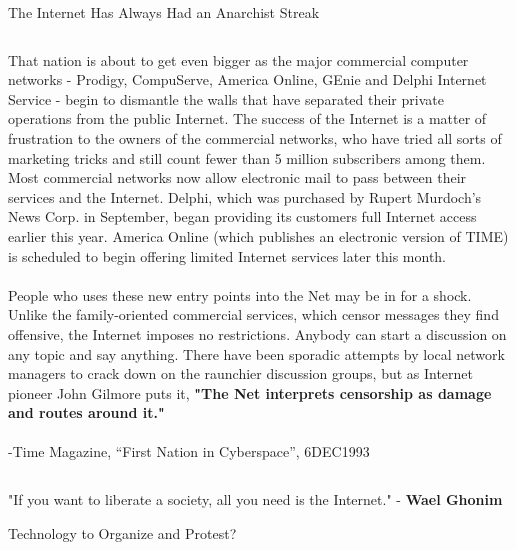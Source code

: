 \documentclass[nobackground,dvipsnames,table]{beamer}
\begin{document}
\begin{frame}{The Internet Has Always Had an Anarchist Streak}
    \begin{columns}
            That nation is about to get even bigger as the major commercial computer networks - Prodigy, CompuServe, America Online, GEnie and Delphi Internet Service - begin to dismantle the walls that have separated their private operations from the public Internet. The success of the Internet is a matter of frustration to the owners of the commercial networks, who have tried all sorts of marketing tricks and still count fewer than 5 million subscribers among them. Most commercial networks now allow electronic mail to pass between their services and the Internet. Delphi, which was purchased by Rupert Murdoch's News Corp. in September, began providing its customers full Internet access earlier this year. America Online (which publishes an electronic version of TIME) is scheduled to begin offering limited Internet services later this month.\\~\\
            
            People who uses these new entry points into the Net may be in for a shock. Unlike the family-oriented commercial services, which censor messages they find offensive, the Internet imposes no restrictions. Anybody can start a discussion on any topic and say anything. There have been sporadic attempts by local network managers to crack down on the raunchier discussion groups, but as Internet pioneer John Gilmore puts it, \textbf{"The Net interprets censorship as damage and routes around it."}\\~\\
            
            -Time Magazine, “First Nation in Cyberspace”, 6DEC1993
    \end{columns}
\end{frame}

\begin{frame}{"If you want to liberate a society, all you need is the Internet." - \textbf{Wael Ghonim}}
\end{frame}

\begin{frame}{Technology to Organize and Protest?}
\end{frame}
\end{document}
